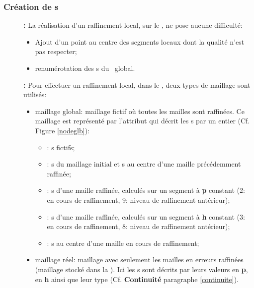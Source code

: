       \subsubsection{Création de \n s}
	\begin{description}
	 \item[\textbullet] \textbf{\sgp:}
	 \smallbreak
	 La réalisation d'un raffinement local, sur le \sgp, ne pose aucune difficulté:
	  \vspace{0.3cm}
	  \begin{itemize}
	  \item Ajout d'un point au centre des segments locaux dont la qualité n'est pas respecter;
	  \item renumérotation des \n s du \sgp\ global.
	  \end{itemize}
	 
	 \vspace{0.3cm}
	 \item[\textbullet] \textbf{\pph:}
	   \smallbreak
	   Pour effectuer un raffinement local, dans le \pph, deux types de maillage sont utilisés:
	   \vspace{0.3cm}
	   \begin{itemize}
	    \item maillage global: maillage fictif où toutes les mailles sont raffinées. 
	    Ce maillage est représenté par l'attribut  qui décrit les \n s par un entier (Cf. Figure \ref{nodeglb}):
	      \begin{itemize}
		\item[\ding{213}] : \n s fictifs; 
		\item[\ding{213}] : \n s du maillage initial et \n s au centre d'une maille précédemment raffinée;
		\item[\ding{213}] : \n s d'une maille raffinée, calculés sur un segment à \textbf{p} constant 
		(2: en cours de raffinement, 9: niveau de raffinement antérieur);
		\item[\ding{213}] : \n s d'une maille raffinée, calculés sur un segment à \textbf{h} constant 
		(3: en cours de raffinement, 8: niveau de raffinement antérieur);
		\item[\ding{213}] : \n s au centre d'une maille en cours de raffinement;
	      \end{itemize}
	    \vspace{0.3cm}
	    \item maillage réel: maillage avec seulement les mailles en erreurs raffinées (maillage stocké dans la \bdd). 
	    Ici les \n s sont décrits par leurs valeurs en \textbf{p}, en \textbf{h} ainsi que leur type (Cf. \textbf{Continuité} paragraphe \ref{continuite}).
	   \end{itemize}


\end{description}
